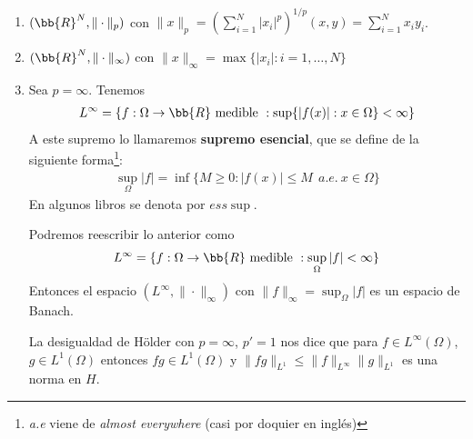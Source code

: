 \begin{ejemplo}\ \\
    \begin{enumerate}
        \item $(\bb{R}^N, \|\cdot\|_ p)$ con $\|x\|_p = (\sum_{i=1}^N |x_i|^p)^{1/p}(x,y) = \sum_{i=1}^N x_i y_i$.
        \item $(\bb{R}^N, \|\cdot\|_\infty)$ con $\|x\|_\infty = \max \{|x_i|: i=1,\dots,N\}$
        \item Sea $p=\infty$. Tenemos
        \begin{gather*}
            L^{\infty} = \{f:\Omega \to \bb{R} \text{ medible } : \sup\{|f(x)| : x\in \Omega\}< \infty\}
        \end{gather*}
        A este supremo lo llamaremos \textbf{supremo esencial}, que se define de la siguiente forma\footnote{\textit{a.e} viene de \textit{almost everywhere} (casi por doquier en inglés)}:
        \begin{gather*}
            \sup_{\Omega}|f| = \inf \{M \geq 0 : |f(x)| \leq M \ \ a.e. \ x\in \Omega\}
        \end{gather*}        
        En algunos libros se denota por $ess\sup$.

        Podremos reescribir lo anterior como
        \begin{gather*}
            L^{\infty} = \{f:\Omega \to \bb{R} \text{ medible } : \sup_\Omega |f|< \infty\}
        \end{gather*}
        Entonces el espacio $(L^\infty, \|\cdot\|_\infty)$ con $\|f\|_\infty = \sup_\Omega |f|$ es un espacio de Banach.

        La desigualdad de Hölder con $p=\infty$, $p'=1$ nos dice que para $f \in L^\infty(\Omega)$, $g\in L^1(\Omega)$ entonces $fg \in L^1(\Omega)$ y $\|fg\|_{L^1}\leq \|f\|_{L^\infty} \|g\|_{L^{1}}$ es una norma en $H$.
    \end{enumerate}
\end{ejemplo}


